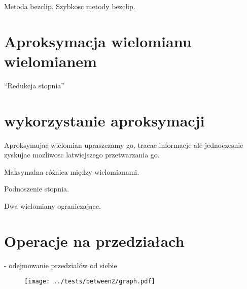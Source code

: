 \documentclass[11pt,a4paper,oneside]{report}
\begin{document}
Metoda bezclip. Szybkosc metody bezclip.

\section{Aproksymacja wielomianu wielomianem}

``Redukcja stopnia''

\section{wykorzystanie aproksymacji}

Aproksymujac wielomian upraszczamy go, tracac informacje ale jednoczesnie zyskujac mozliwosc latwiejszego przetwarzania go.

Maksymalna różnica między wielomianami.

Podnoszenie stopnia.

Dwa wielomiany ograniczające.

\section{Operacje na przedziałach}

- odejmowanie przedziałów od siebie

\begin{center}
\begin{figure}
\texttt{[image: ../tests/between2/graph.pdf]}
\end{figure}
\end{center}
\end{document}
